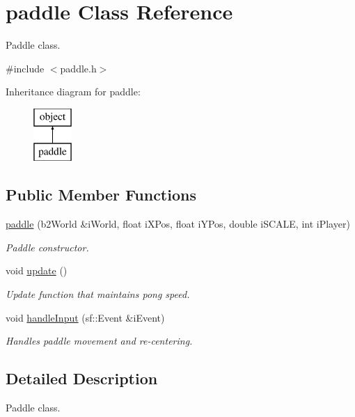 \hypertarget{classpaddle}{}\section{paddle Class Reference}
\label{classpaddle}


Paddle class.  




{\ttfamily \#include $<$paddle.\+h$>$}

Inheritance diagram for paddle\+:\begin{figure}[H]
\begin{center}
\leavevmode
\includegraphics[height=2.000000cm]{classpaddle}
\end{center}
\end{figure}
\subsection*{Public Member Functions}
\begin{DoxyCompactItemize}
\item 
\hyperlink{classpaddle_a49204236762e7810824271d3c7c793c5}{paddle} (b2\+World \&i\+World, float i\+X\+Pos, float i\+Y\+Pos, double i\+S\+C\+A\+LE, int i\+Player)
\begin{DoxyCompactList}\small\item\em Paddle constructor. \end{DoxyCompactList}\item 
void \hyperlink{classpaddle_ae20fb7dc01d0a3b92ebc49e5d132aee8}{update} ()
\begin{DoxyCompactList}\small\item\em Update function that maintains pong speed. \end{DoxyCompactList}\item 
void \hyperlink{classpaddle_ac20b5583e5d21b34dd831f0289aae244}{handle\+Input} (sf\+::\+Event \&i\+Event)
\begin{DoxyCompactList}\small\item\em Handles paddle movement and re-\/centering. \end{DoxyCompactList}\end{DoxyCompactItemize}


\subsection{Detailed Description}
Paddle class. 

